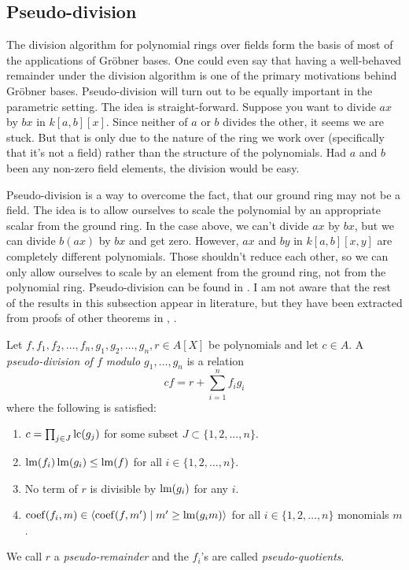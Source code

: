 \subsection{Pseudo-division}
The division algorithm for polynomial rings over fields form the basis of most of the applications of Gröbner bases. One could even say that having a well-behaved remainder under the division algorithm is one of the primary motivations behind Gröbner bases. Pseudo-division will turn out to be equally important in the parametric setting. The idea is straight-forward. Suppose you want to divide $ax$ by $bx$ in $k[a, b][x]$. Since neither of $a$ or $b$ divides the other, it seems we are stuck. But that is only due to the nature of the ring we work over (specifically that it's not a field) rather than the structure of the polynomials. Had $a$ and $b$ been any non-zero field elements, the division would be easy.

Pseudo-division is a way to overcome the fact, that our ground ring may not be a field. The idea is to allow ourselves to scale the polynomial by an appropriate scalar from the ground ring. In the case above, we can't divide $ax$ by $bx$, but we can divide $b(ax)$ by $bx$ and get zero. However, $ax$ and $by$ in $k[a, b][x, y]$ are completely different polynomials. Those shouldn't reduce each other, so we can only allow ourselves to scale by an element from the ground ring, not from the polynomial ring. Pseudo-division can be found in \cite{IVA}. I am not aware that the rest of the results in this subsection appear in literature, but they have been extracted from proofs of other theorems in \cite{grb_covers}, \cite{MONTES20101391}.

\begin{definition}
  Let $f, f_{1}, f_{2}, \dots, f_{n}, g_{1}, g_{2}, \dots, g_{n}, r \in A[X]$ be polynomials and let $c \in A$. A \textit{pseudo-division of $f$ modulo $g_{1}, \dots, g_{n}$} is a relation
  \[cf = r + \sum_{i=1}^{n} f_{i}g_{i}\]
  where the following is satisfied:
  \begin{enumerate}
    \item $c = \prod_{j\in J} \operatorname{lc}(g_{j})$ for some subset $J \subset \{1, 2, \dots, n\}$.
    \item $\operatorname{lm}(f_{i})\operatorname{lm}(g_{i}) \leq \operatorname{lm}(f)$ for all $i \in \{1, 2, \dots, n\}$.
    \item No term of $r$ is divisible by $\operatorname{lm}(g_{i})$ for any $i$.
    \item $\operatorname{coef}(f_{i}, m) \in \langle \operatorname{coef}(f, m') \mid m' \geq \operatorname{lm}(g_{i}m) \rangle$ for all $i \in \{1, 2, \dots, n\}$ monomials $m$.
  \end{enumerate}
  We call $r$ a \textit{pseudo-remainder} and the $f_{i}$'s are called \textit{pseudo-quotients}.
\end{definition}


